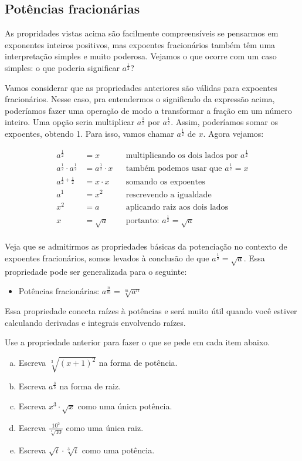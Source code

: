 \documentclass[main_estudante.tex]{subfiles}
\begin{document}
\subsection*{Potências fracionárias}

As propridades vistas acima são facilmente compreensíveis se pensarmos em exponentes inteiros positivos, mas expoentes fracionários também têm uma interpretação simples e muito poderosa. Vejamos o que ocorre com um caso simples: o que poderia significar $a^\frac{1}{2}$? 

Vamos considerar que as propriedades anteriores são válidas para expoentes fracionários. Nesse caso, pra entendermos o significado da expressão acima, poderíamos fazer uma operação de modo a transformar a fração em um número inteiro. Uma opção seria multiplicar $a^\frac{1}{2}$ por $a^\frac{1}{2}$. Assim, poderíamos somar os expoentes, obtendo 1. Para isso, vamos chamar $a^\frac{1}{2}$ de $x$. Agora vejamos:

\begin{align*}
a^\frac{1}{2} &= x && \text{multiplicando os dois lados por } a^\frac{1}{2} \\
a^\frac{1}{2} \cdot a^\frac{1}{2} &= a^\frac{1}{2} \cdot x && \text{também podemos usar que } a^\frac{1}{2} = x \\
a^{\frac{1}{2}+\frac{1}{2}} &= x \cdot x && \text{somando os expoentes}\\
a^1 &= x^2 && \text{rescrevendo a igualdade}\\
x^2 &= a && \text{aplicando raiz aos dois lados}\\
x &= \sqrt{a} && \text{portanto: } a^\frac{1}{2} = \sqrt{a} \\
\end{align*}

Veja que se admitirmos as propriedades básicas da potenciação no contexto de expoentes fracionários, somos levados à conclusão de que $a^\frac{1}{2} = \sqrt{a}$. Essa propriedade pode ser generalizada para o seguinte:

\begin{itemize}
 \item Potências fracionárias: $a^\frac{n}{m}  = \sqrt[m]{a^n}$
\end{itemize}

Essa propriedade conecta raízes à potências e será muito útil quando você estiver calculando derivadas e integrais envolvendo raízes.

\begin{questao}
Use a propriedade anterior para fazer o que se pede em cada item abaixo.
\begin{enumerate}[a)]
\item Escreva $\sqrt[3]{(x+1)^2}$ na forma de potência.
\item Escreva  $a^{\frac{3}{5}}$ na forma de raiz.
\item Escreva $x^3 \cdot \sqrt{x}$ como uma única potência.
\item Escreva $\frac{10^2}{\sqrt[3]{10}}$ como uma única raiz.
\item Escreva $\sqrt{t} \cdot \sqrt[3]{t}$ como uma potência.
\end{enumerate}
\end{questao}
\end{document}

